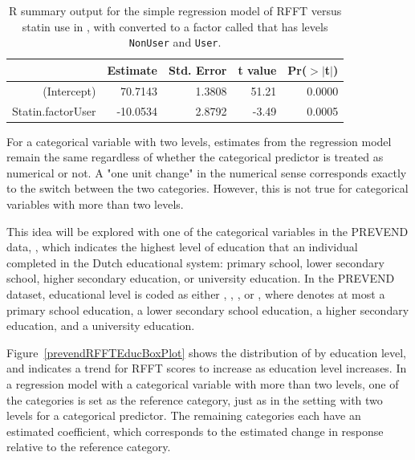 \begin{table}[ht]
	\centering
	\begin{tabular}{rrrrr}
		\hline
		& Estimate & Std. Error & t value & Pr($>$$|$t$|$) \\ 
		\hline
		(Intercept) & 70.7143 & 1.3808 & 51.21 & 0.0000 \\ 
		 Statin.factorUser & -10.0534 & 2.8792 & -3.49 & 0.0005 \\ 
		\hline
	\end{tabular}
	\caption{\textsf{R} summary output for the simple regression model of RFFT versus statin use in , with  converted to a factor called  that has levels \texttt{NonUser} and \texttt{User}.} 
	\label{prevendRFFTStatinFactorRegression}
\end{table}

For a categorical variable with two levels, estimates from the regression model remain the same regardless of whether the categorical predictor is treated as numerical or not. A "one unit change" in the numerical sense corresponds exactly to the switch between the two categories. However, this is not true for categorical variables with more than two levels. 

This idea will be explored with one of the categorical variables in the PREVEND data, , which indicates the highest level of education that an individual completed in the Dutch educational system: primary school, lower secondary school, higher secondary education, or university education. In the PREVEND dataset, educational level is coded as either , , , or , where  denotes at most a primary school education,  a lower secondary school education,  a higher secondary education, and  a university education.

Figure~\ref{prevendRFFTEducBoxPlot} shows the distribution of  by education level, and indicates a trend for RFFT scores to increase as education level increases. In a regression model with a categorical variable with more than two levels, one of the categories is set as the reference category, just as in the setting with two levels for a categorical predictor. The remaining categories each have an estimated coefficient, which corresponds to the estimated change in response relative to the reference category. 

